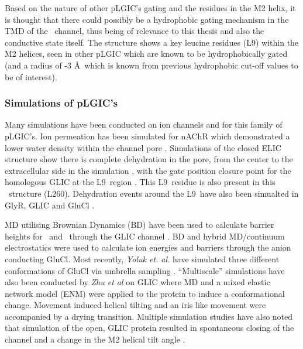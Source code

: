 Based on the nature of other pLGIC's gating and the residues in the M2 helix, it is thought that there could possibly be a hydrophobic gating mechanism in the TMD of the \HT\ channel, thus being of relevance to this thesis and also the conductive state itself. The structure shows a key leucine residues (L9\textquotesingle) within the M2 helices, seen in other pLGIC \cite{Miyazawa2003,Bocquet2009,Hibbs2011} which are known to be hydrophobically gated (and a  radius of -3 \AA\ which is known from previous hydrophobic cut-off values to be of interest). 

\subsubsection*{Simulations of pLGIC's}

Many simulations have been conducted on ion channels \cite{Ma2012a} and for this family of pLGIC's.
Ion permeation has been simulated for nAChR which demonstrated a lower water density within the channel pore \cite{Beckstein2006b}. Simulations of the closed ELIC structure show there is complete dehydration in the pore, from the center to the extracellular side in the simulation \cite{Cheng2009}, with the gate position closure point for the homologous GLIC at the L9\textquotesingle\ region \cite{Lynch2004,Keramidas2004,Cheng2007a,Miyazawa2003}. This L9\textquotesingle\ residue is also present in this \HT\ structure (L260). Dehydration events around the L9\textquotesingle\ have also been simualted in GlyR, GLIC and GluCl \cite{Murail2011,LeBard2012,Cheng2012}.

MD utilising Brownian Dynamics (BD) have been used to calculate barrier heights for \Cl\ and \Na\ through the GLIC channel \cite{Cheng2010}. BD and hybrid MD/continuum electrostatics were used to calculate ion energies and barriers through the anion conducting GluCl. Most recently, \textit{Yoluk et. al.} have simulated three different conformations of GluCl via umbrella sampling \cite{Yoluk2015}. ``Multiscale'' simulations have also been conducted by \textit{Zhu et al} \cite{Zhu2010} on GLIC where MD and a mixed elastic network model (ENM) were applied to the protein to induce a conformational change. Movement induced helical tilting and an iris like movement were accompanied by a drying transition. Multiple simulation studies have also noted that simulation of the open, GLIC protein resulted in spontaneous closing of the channel \cite{Willenbring2011,Nury2010,Zhu2010} and a change in the M2 helical tilt angle \cite{Willenbring2011,Hibbs2011}.

